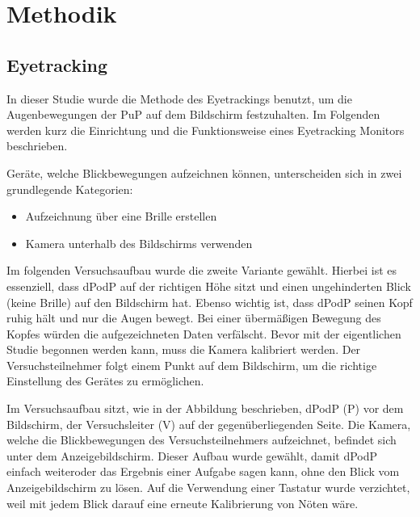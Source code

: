 \chapter{Methodik}

\section{Eyetracking}

In dieser Studie wurde die Methode des Eyetrackings benutzt, um die Augenbewegungen der \gls{PuP} auf dem Bildschirm festzuhalten. Im Folgenden werden kurz die Einrichtung und die Funktionsweise eines Eyetracking Monitors beschrieben. 

Geräte, welche Blickbewegungen aufzeichnen können, unterscheiden sich in zwei grundlegende Kategorien:
    \begin{itemize}
        \item Aufzeichnung über eine Brille erstellen
        \item Kamera unterhalb des Bildschirms verwenden
    \end{itemize}


Im folgenden Versuchsaufbau wurde die zweite Variante gewählt. Hierbei ist es essenziell, dass \gls{dPodP} auf der richtigen Höhe sitzt und einen ungehinderten Blick (keine Brille) auf den Bildschirm hat. Ebenso wichtig ist, dass \gls{dPodP} seinen Kopf ruhig hält und nur die Augen bewegt. Bei einer übermäßigen Bewegung des Kopfes würden die aufgezeichneten Daten verfälscht. Bevor mit der eigentlichen Studie begonnen werden kann, muss die Kamera kalibriert werden. Der Versuchsteilnehmer folgt einem Punkt auf dem Bildschirm, um die richtige Einstellung des Gerätes zu ermöglichen. 


Im Versuchsaufbau sitzt, wie in der Abbildung beschrieben, \gls{dPodP} (P) vor dem Bildschirm, der Versuchsleiter (V) auf der gegenüberliegenden Seite.
Die Kamera, welche die Blickbewegungen des Versuchsteilnehmers aufzeichnet, befindet sich unter dem Anzeigebildschirm. Dieser Aufbau wurde gewählt, damit \gls{dPodP} einfach \grqq weiter\grqq oder das Ergebnis einer Aufgabe sagen kann, ohne den Blick vom Anzeigebildschirm zu lösen. Auf die Verwendung einer Tastatur wurde verzichtet, weil mit jedem Blick darauf eine erneute Kalibrierung von Nöten wäre.

